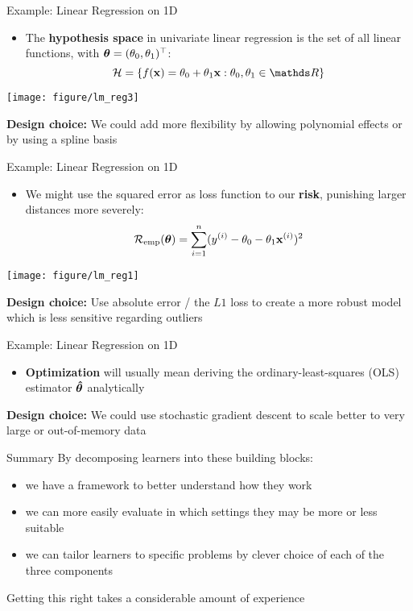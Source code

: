 \documentclass[11pt,compress,t,notes=noshow, xcolor=table]{beamer}
\begin{document}
\begin{frame2}{Example: Linear Regression on 1D}
\begin{itemize}
\item The \textbf{hypothesis space} in univariate linear regression is the set of all linear functions, with $\bm{\theta} = (\theta_0, \theta_1)^\top$:
$$
\Hspace = \{\fx = \theta_0 + \theta_1 \xv: \theta_0, \theta_1 \in \R \}
$$
\end{itemize}
\begin{center}
\texttt{[image: figure/lm\_reg3]} 
\end{center}
\textbf{Design choice:} We could add more flexibility by allowing polynomial effects or by using a spline basis
\end{frame2}


\begin{frame2}{Example: Linear Regression on 1D}
\begin{itemize}  
\item We might use the squared error as loss function to our \textbf{risk}, punishing larger distances more severely:
$$
\mathcal{R}_{\text{emp}}(\bm{\theta}) = \sum\limits_{i=1}^n (y^{(i)} - \theta_0 - \theta_1 \mathbf{x}^{(i)})^2
$$
\end{itemize}
\begin{center}
\texttt{[image: figure/lm\_reg1]} 
\end{center}
\textbf{Design choice:} Use absolute error / the $L1$ loss to create a more robust model which is less sensitive regarding outliers
\end{frame2}


\begin{frame2}{Example: Linear Regression on 1D}
\begin{itemize}  
\item \textbf{Optimization} will usually mean deriving the ordinary-least-squares (OLS) estimator $\bm{\hat\theta}$ analytically
\end{itemize}
\textbf{Design choice:} We could use stochastic gradient descent to scale better to very large or out-of-memory data
\end{frame2}


\begin{frame2}{Summary}
By decomposing learners into these building blocks:
\spacer
\begin{itemize}
\item we have a framework to better understand how they work
\item we can more easily evaluate in which settings they may be more or less suitable
\item we can tailor learners to specific problems by clever choice of each of the three components
\end{itemize}
\spacer
Getting this right takes a considerable amount of experience
\end{frame2}

\endlecture
\end{document}
